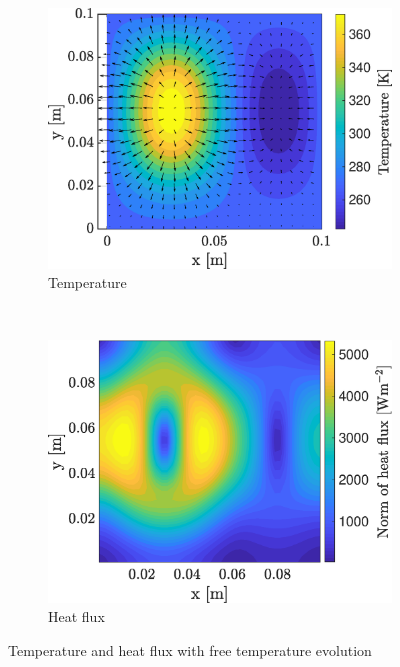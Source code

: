 \documentclass[a4paper,12pt,twoside]{article}
\begin{document}
\begin{figure}[h]
  \centering
  \begin{subfigure}[t]{0.45\textwidth}
    \centering
    \includegraphics[width=\textwidth]{graphs/f_temp.eps}
    \caption{Temperature}
    \label{fig:ftemp}
  \end{subfigure}
  ~
  \begin{subfigure}[t]{0.45\textwidth}
    \centering
    \includegraphics[width=\textwidth]{graphs/f_heat_flux.eps}
    \caption{Heat flux}
    \label{fig:fflux}
  \end{subfigure}
  \caption{Temperature and heat flux with free temperature evolution}
  \label{fig:flibre}
\end{figure}
\end{document}
